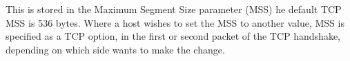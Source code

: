 This is stored in the Maximum Segment Size parameter (MSS) he default TCP MSS is 536 bytes. Where a host wishes to set the MSS to another value, MSS is specified as a TCP option, in the first or second packet of the TCP handshake, depending on which side wants to make the change.